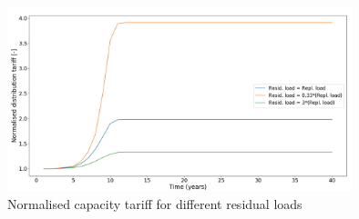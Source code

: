 \noindent
\newline
\begin{figure}[h!]
    \centering
    \includegraphics[width=10cm]{AppendixA/DistNBresid.PNG}
    \caption{Normalised capacity tariff for different residual loads}
    \label{fig:T}
\end{figure}
